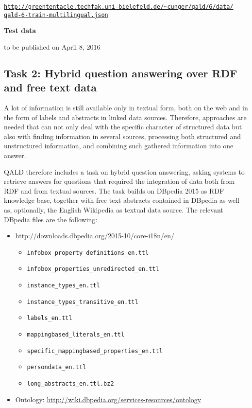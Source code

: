 \href{http://greententacle.techfak.uni-bielefeld.de/~cunger/qald/6/data/qald-6-train-multilingual.json}{\texttt{http://greententacle.techfak.uni-bielefeld.de/\textasciitilde cunger/qald/6/data/\\qald-6-train-multilingual.json}}

\textbf{Test data}

to be published on April 8, 2016


\subsection{Task 2: Hybrid question answering over RDF and free text data}

A lot of information is still available only in textual form, both on the web and in the form of labels and abstracts in linked data sources.
Therefore, approaches are needed that can not only deal with the specific character of structured data but also with finding information in several sources, processing both structured and unstructured information, and combining such gathered information into one answer.

QALD therefore includes a task on hybrid question answering, asking systems to retrieve answers for questions that required the integration of data both from RDF and from textual sources.
The task builds on DBpedia 2015 as RDF knowledge base, together with free text abstracts contained in DBpedia as well as, optionally, the English Wikipedia as textual data source.
The relevant DBpedia files are the following:
\begin{itemize}
\item \url{http://downloads.dbpedia.org/2015-10/core-i18n/en/}
  \begin{itemize}
  \item \texttt{infobox\_property\_definitions\_en.ttl}
  \item \texttt{infobox\_properties\_unredirected\_en.ttl}
  \item \texttt{instance\_types\_en.ttl}
  \item \texttt{instance\_types\_transitive\_en.ttl}
  \item \texttt{labels\_en.ttl}
  \item \texttt{mappingbased\_literals\_en.ttl}
  \item \texttt{specific\_mappingbased\_properties\_en.ttl}
  \item \texttt{persondata\_en.ttl}
  \item \texttt{long\_abstracts\_en.ttl.bz2}
\end{itemize}
\item Ontology: \url{http://wiki.dbpedia.org/services-resources/ontology}
\end{itemize}

